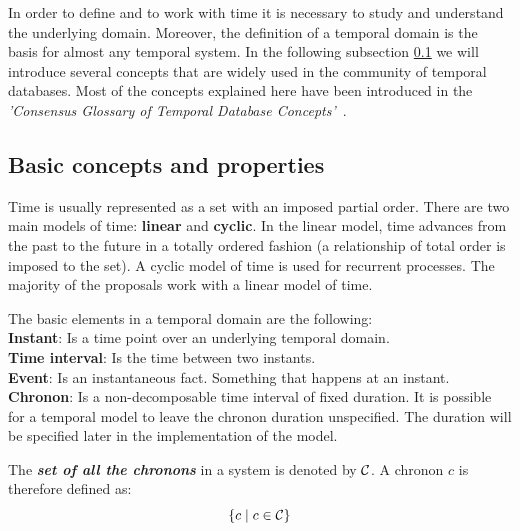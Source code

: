 %
%
In order to define and to work with time it is necessary to study and understand the underlying domain. Moreover, the definition of a temporal domain is the basis for almost any temporal system. In the following subsection \ref{subsec:basic-concepts} we will introduce several concepts that are widely used in the community of temporal databases. Most of the concepts explained here have been introduced in the \emph{'Consensus Glossary of Temporal Database Concepts'}~\cite{Dyreson:1994:CGT:181550.181560}.



\subsection{Basic concepts and properties}
\label{subsec:basic-concepts}

Time is usually represented as a set with an imposed partial order. There are two main models of time: \textbf{linear} and \textbf{cyclic}. In the linear model, time advances from the past to the future in a totally ordered fashion (a relationship of total order is imposed to the set). A cyclic model of time is used for recurrent processes. The majority of the proposals work with a linear model of time.

\begin{svgraybox}
The basic elements in a temporal domain are the following:\\
\textbf{Instant}:  Is a time point over an underlying temporal domain.\\
\textbf{Time interval}: Is the time between two instants.\\
\textbf{Event}: Is an instantaneous fact. Something that happens at an instant.\\
\textbf{Chronon}: Is a non-decomposable time interval of fixed duration. It is possible for a temporal model to leave the chronon duration unspecified. The duration will be specified later in the implementation of the model.
\end{svgraybox}

\begin{definition}
\label{def:set-chronon}
The \textbf{\emph{set of all the chronons}} in a system is denoted by $\mathcal{C}$. A chronon $c$ is therefore defined as:
\begin{equation}
\left \lbrace c \mid c \in \mathcal{C} \right \rbrace
\end{equation}
\end{definition}

